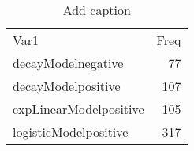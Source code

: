 \begin{table}[htbp]
  \centering
  \caption{Add caption}
    \begin{tabular}{lr}
    Var1  & \multicolumn{1}{l}{Freq} \\
    decayModelnegative & 77 \\
    decayModelpositive & 107 \\
    expLinearModelpositive & 105 \\
    logisticModelpositive & 317 \\
    \end{tabular}%
  \label{tab:addlabel}%
\end{table}%
